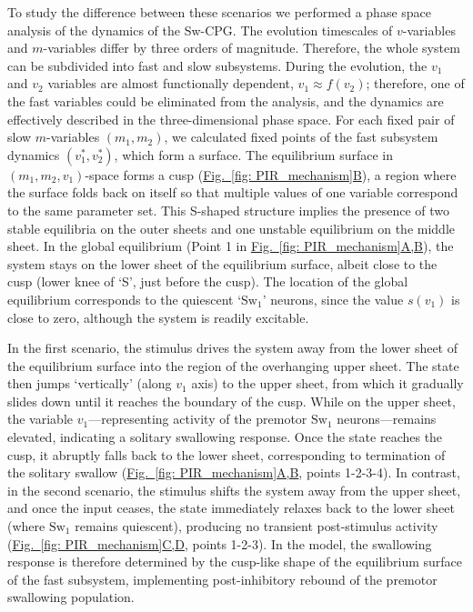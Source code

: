\documentclass[pdflatex,sn-mathphys-ay]{sn-jnl}%
\renewcommand{\figureautorefname}{Fig.}
\newcommand{\Figref}[2][]{\hyperref[#2]{\figureautorefname~\ref*{#2}#1}}
\theoremstyle{thmstyleone}%
\theoremstyle{thmstyletwo}%
\theoremstyle{thmstylethree}%
\begin{document}
To study the difference between these scenarios we performed a phase space analysis of the dynamics of the Sw-CPG. The evolution timescales of $v$-variables and $m$-variables differ by three orders of magnitude. Therefore, the whole system can be subdivided into fast and slow subsystems. During the evolution, the $v_1$ and $v_2$ variables are almost functionally dependent, $v_1 \approx f(v_2)$; therefore, one of the fast variables could be eliminated from the analysis, and the dynamics are effectively described in the three-dimensional phase space.
For each fixed pair of slow $m$-variables $(m_1,m_2)$, we calculated fixed points of the fast subsystem dynamics $(v_1^*,v_2^*)$, which form a surface. The equilibrium surface in $(m_1,m_2,v_1)$-space forms a cusp (\Figref[B]{fig: PIR_mechanism}), a region where the surface folds back on itself so that multiple values of one variable correspond to the same parameter set. This S-shaped structure implies the presence of two stable equilibria on the outer sheets and one unstable equilibrium on the middle sheet.
In the global equilibrium (Point 1 in \Figref[A,B]{fig: PIR_mechanism}), the system stays on the lower sheet of the equilibrium surface, albeit close to the cusp (lower knee of `S', just before the cusp). The location of the global equilibrium corresponds to the quiescent `$\text{Sw}_1$’ neurons, since the value $s(v_1)$ is close to zero, although the system is readily excitable.

In the first scenario, the stimulus drives the system away from the lower sheet of the equilibrium surface into the region of the overhanging upper sheet. The state then jumps `vertically' (along $v_1$ axis) to the upper sheet, from which it gradually slides down until it reaches the boundary of the cusp. While on the upper sheet, the variable $v_1$---representing activity of the premotor $\text{Sw}_1$ neurons---remains elevated, indicating a solitary swallowing response. Once the state reaches the cusp, it abruptly falls back to the lower sheet, corresponding to termination of the solitary swallow (\Figref[A,B]{fig: PIR_mechanism}, points 1-2-3-4). In contrast, in the second scenario, the stimulus shifts the system away from the upper sheet, and once the input ceases, the state immediately relaxes back to the lower sheet (where $\text{Sw}_1$ remains quiescent), producing no transient post-stimulus activity (\Figref[C,D]{fig: PIR_mechanism}, points 1-2-3).
In the model, the swallowing response is therefore determined by the cusp-like shape of the equilibrium surface of the fast subsystem, implementing post-inhibitory rebound of the premotor swallowing population.
\end{document}
